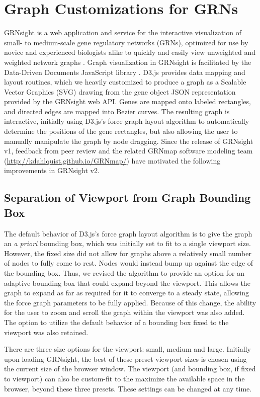 \documentclass[sigconf,review]{acmart}
\begin{document}
\section{Graph Customizations for GRNs}

GRNsight is a web application and service for the interactive visualization of small- to medium-scale gene regulatory networks (GRNs), optimized for use by novice and experienced biologists alike to quickly and easily view unweighted and weighted network graphs \cite{peerj}. Graph visualization in GRNsight is facilitated by the Data-Driven Documents JavaScript library \cite{d3}. D3.js provides data mapping and layout routines, which we heavily customized to produce a graph as a Scalable Vector Graphics (SVG) drawing from the gene object JSON representation provided by the GRNsight web API. Genes are mapped onto labeled rectangles, and directed edges are mapped into Bezier curves. The resulting graph is interactive, initially using D3.js's force graph layout algorithm to automatically determine the positions of the gene rectangles, but also allowing the user to manually manipulate the graph by node dragging. Since the release of GRNsight v1, feedback from peer review and the related GRNmap software modeling team (\url{http://kdahlquist.github.io/GRNmap/}) have motivated the following improvements in GRNsight v2.

\subsection{Separation of Viewport from Graph Bounding Box}
The default behavior of D3.js's force graph layout algorithm is to give the graph an \emph{a priori} bounding box, which was initially set to fit to a single viewport size. However, the fixed size did not allow for graphs above a relatively small number of nodes to fully come to rest. Nodes would instead bump up against the edge of the bounding box. Thus, we revised the algorithm to provide an option for an adaptive bounding box that could expand beyond the viewport. This allows the graph to expand as far as required for it to converge to a steady state, allowing the force graph parameters to be fully applied. Because of this change, the ability for the user to zoom and scroll the graph within the viewport was also added. The option to utilize the default behavior of a bounding box fixed to the viewport was also retained.

There are three size options for the viewport: small, medium and large. Initially upon loading GRNsight, the best of these preset viewport sizes is chosen using the current size of the browser window. The viewport (and bounding box, if fixed to viewport) can also be custom-fit to the maximize the available space in the browser, beyond these three presets. These settings can be changed at any time. 
\end{document}
